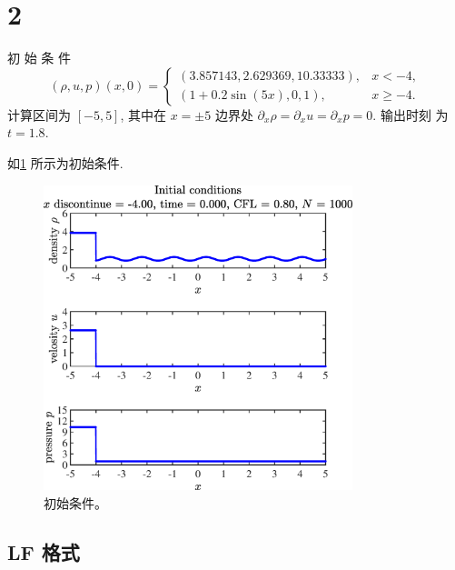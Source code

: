 \documentclass[12pt]{article}
\begin{document}
\section{2}

初 始 条 件
\begin{equation}
	(\rho, u, p)(x, 0)=\left\{\begin{array}{ll}
		(3.857143,2.629369,10.33333), & x<-4, \\
		(1+0.2 \sin (5 x), 0,1), & x \geq-4.
		\end{array}\right.
\end{equation}
计算区间为 $[-5,5]$, 其中在 $x=\pm 5$ 边界处 $\partial_{x} \rho=\partial_{x} u=\partial_{x} p=0 .$ 输出时刻 为 $t=1.8$.

如\cref{fig:4ini} 所示为初始条件.

\begin{figure}[htp]
	\centering
	\includegraphics[width=9cm]{4Initial_conditions.eps}
	\vspace{20pt}
	\caption{初始条件。}
	\label{fig:4ini}
\end{figure}


\subsection{LF 格式}
\end{document}
